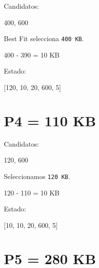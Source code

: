 \documentclass[
  spanish,
  letterpaper,
]{scrbook}
\newenvironment{Shaded}{\begin{snugshade}}{\end{snugshade}}
\newcommand{\NormalTok}[1]{\textcolor[rgb]{0.00,0.23,0.31}{#1}}
\begin{document}
Candidatos:

\begin{Shaded}
\begin{Highlighting}[]
\NormalTok{400, 600}
\end{Highlighting}
\end{Shaded}

Best Fit selecciona \texttt{400\ KB}.

\begin{Shaded}
\begin{Highlighting}[]
\NormalTok{400 {-} 390 = 10 KB}
\end{Highlighting}
\end{Shaded}

Estado:

\begin{Shaded}
\begin{Highlighting}[]
\NormalTok{[120, 10, 20, 600, 5]}
\end{Highlighting}
\end{Shaded}

\section{P4 = 110 KB}\label{p4-110-kb-1}

Candidatos:

\begin{Shaded}
\begin{Highlighting}[]
\NormalTok{120, 600}
\end{Highlighting}
\end{Shaded}

Seleccionamos \texttt{120\ KB}.

\begin{Shaded}
\begin{Highlighting}[]
\NormalTok{120 {-} 110 = 10 KB}
\end{Highlighting}
\end{Shaded}

Estado:

\begin{Shaded}
\begin{Highlighting}[]
\NormalTok{[10, 10, 20, 600, 5]}
\end{Highlighting}
\end{Shaded}

\section{P5 = 280 KB}\label{p5-280-kb-1}
\end{document}
